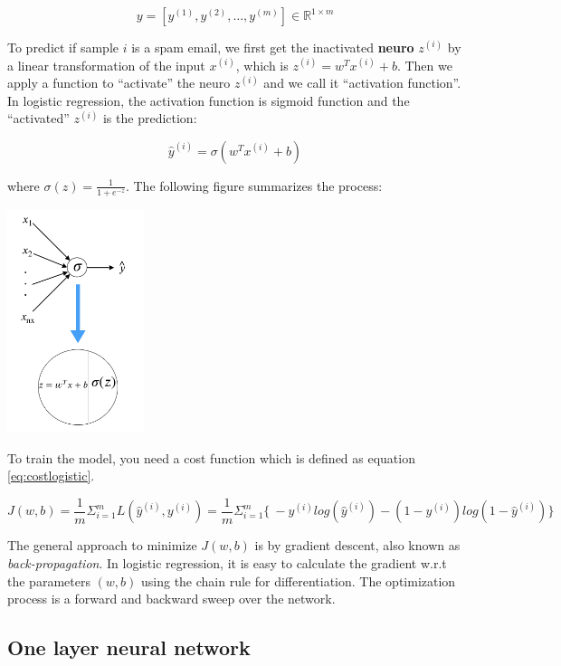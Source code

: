 \documentclass[12pt,]{krantz}
\theoremstyle{definition}
\theoremstyle{definition}
\theoremstyle{definition}
\theoremstyle{remark}
\begin{document}
\[y=[y^{(1)},y^{(2)},\dots,y^{(m)}] \in \mathbb{R}^{1 \times m}\]

To predict if sample \(i\) is a spam email, we first get the inactivated
\textbf{neuro} \(z^{(i)}\) by a linear transformation of the input
\(x^{(i)}\), which is \(z^{(i)}=w^Tx^{(i)} + b\). Then we apply a
function to ``activate'' the neuro \(z^{(i)}\) and we call it
``activation function''. In logistic regression, the activation function
is sigmoid function and the ``activated'' \(z^{(i)}\) is the prediction:

\[\hat{y}^{(i)} = \sigma(w^Tx^{(i)} + b)\]

where \(\sigma(z) = \frac{1}{1+e^{-z}}\). The following figure
summarizes the process:

\includegraphics[width=0.30000\textwidth]{images/dnn0.png}

To train the model, you need a cost function which is defined as
equation \eqref{eq:costlogistic}.

\begin{equation}
J(w,b)=\frac{1}{m} \Sigma_{i=1}^m L(\hat{y}^{(i)}, y^{(i)}) = \frac{1}{m} \Sigma_{i=1}^{m} \{\ -y^{(i)}log(\hat{y}^{(i)})-(1-y^{(i)})log(1-\hat{y}^{(i)}) \}
\label{eq:costlogistic}
\end{equation}

The general approach to minimize \(J(w,b)\) is by gradient descent, also
known as \emph{back-propagation}. In logistic regression, it is easy to
calculate the gradient w.r.t the parameters \((w, b)\) using the chain
rule for differentiation. The optimization process is a forward and
backward sweep over the network.

\subsection{One layer neural network}\label{one-layer-neural-network}
\end{document}
